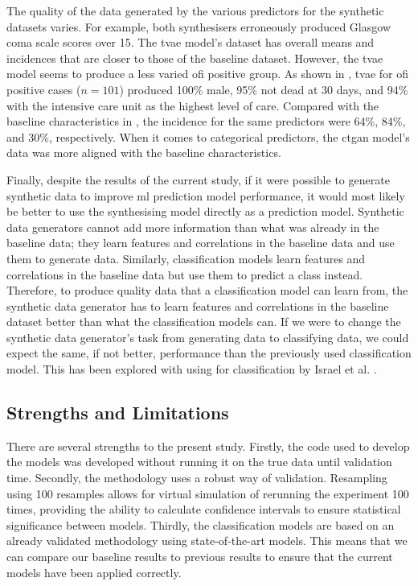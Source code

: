 \documentclass[12pt, a4paper]{article}
\begin{document}
The quality of the data generated by the various predictors for the synthetic datasets varies. For example, both synthesisers erroneously produced Glasgow coma scale scores over 15. The \acrlong{tvae} model's dataset has overall means and incidences that are closer to those of the baseline dataset. However, the \acrshort{tvae} model seems to produce a less varied \acrshort{ofi} positive group. As shown in , \acrshort{tvae} for \acrshort{ofi} positive cases ($n=101$) produced 100\% male, 95\% not dead at 30 days, and 94\% with the intensive care unit as the highest level of care. Compared with the baseline characteristics in , the incidence for the same predictors were 64\%, 84\%, and 30\%, respectively. When it comes to categorical predictors, the \acrshort{ctgan} model's data was more aligned with the baseline characteristics.

Finally, despite the results of the current study, if it were possible to generate synthetic data to improve \acrshort{ml} prediction model performance, it would most likely be better to use the synthesising model directly as a prediction model. Synthetic data generators cannot add more information than what was already in the baseline data; they learn features and correlations in the baseline data and use them to generate data. Similarly, classification models learn features and correlations in the baseline data but use them to predict a class instead. Therefore, to produce quality data that a classification model can learn from, the synthetic data generator has to learn features and correlations in the baseline dataset better than what the classification models can. If we were to change the synthetic data generator's task from generating data to classifying data, we could expect the same, if not better, performance than the previously used classification model. This has been explored with using  for classification by Israel et al. \cite{israel_generative_2017}.

\subsection{Strengths and Limitations}
There are several strengths to the present study. Firstly, the code used to develop the models was developed without running it on the true data until validation time. Secondly, the methodology uses a robust way of validation. Resampling using 100 resamples allows for virtual simulation of rerunning the experiment 100 times, providing the ability to calculate confidence intervals to ensure statistical significance between models. Thirdly, the classification models are based on an already validated methodology using state-of-the-art models. This means that we can compare our baseline results to previous results to ensure that the current models have been applied correctly.
\end{document}
